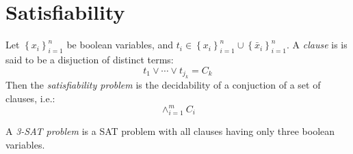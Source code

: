 \section{Satisfiability}
\begin{prob}\label{prob:Satisfiability-1}%
Let $\left\lbrace x_i \right\rbrace_{i=1}^{n} $ be boolean variables, and $t_i \in \left\lbrace 
x_i\right\rbrace_{i=1}^{n}  \cup \left\lbrace \bar{x}_i\right\rbrace_{i=1}^{n}   $.  A 
\textit{clause} is is said to be a disjuction of distinct terms:
$$
t_1 \vee \cdots \vee t_{j_k} = C_k
$$
Then the \textit{satisfiability problem} is the decidability of a conjuction of a set of clauses, 
i.e.:
$$ \wedge_{i=1}^m C_i$$
\end{prob} \cite{skiena2009algorithm}
A \textit{3-SAT problem} is a SAT problem with all clauses having only three boolean variables. 
